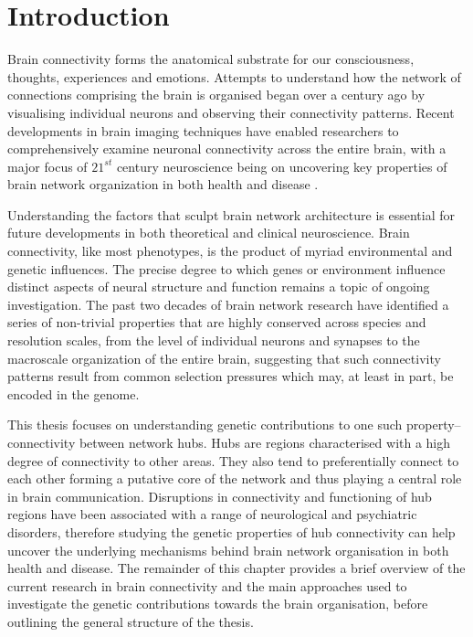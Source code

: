 \chapter{Introduction}
\label{ch:Introduction}

Brain connectivity forms the anatomical substrate for our consciousness, thoughts, experiences and emotions. Attempts to understand how the network of connections comprising the brain is organised began over a century ago by visualising individual neurons and observing their connectivity patterns. Recent developments in brain imaging techniques have enabled researchers to comprehensively examine neuronal connectivity across the entire brain, with a major focus of $21^{st}$ century neuroscience being on uncovering key properties of brain network organization in both health and disease \citep{VandenHeuvel2010b,Bullmore2012,Fornito2015}.

Understanding the factors that sculpt brain network architecture is essential for future developments in both theoretical and clinical neuroscience. Brain connectivity, like most phenotypes, is the product of myriad environmental and genetic influences. The precise degree to which genes or environment influence distinct aspects of neural structure and function remains a topic of ongoing investigation. The past two decades of brain network research have identified a series of non-trivial properties that are highly conserved across species and resolution scales, from the level of individual neurons and synapses to the macroscale organization of the entire brain, suggesting that such connectivity patterns result from common selection pressures which may, at least in part, be encoded in the genome.

This thesis focuses on understanding genetic contributions to one such property--connectivity between network hubs. Hubs are regions characterised with a high degree of connectivity to other areas. They also tend to preferentially connect to each other forming a putative core of the network and thus playing a central role in brain communication. Disruptions in connectivity and functioning of hub regions have been associated with a range of neurological and psychiatric disorders, therefore studying the genetic properties of hub connectivity can help uncover the underlying mechanisms behind brain network organisation in both health and disease. The remainder of this chapter provides a brief overview of the current research in brain connectivity and the main approaches used to investigate the genetic contributions towards the brain organisation, before outlining the general structure of the thesis.


